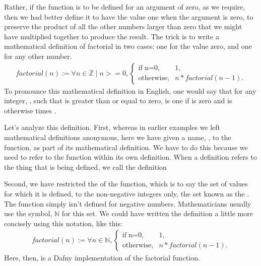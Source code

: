 \documentclass[letterpaper,10pt,english]{sphinxmanual}
\begin{document}
Rather, if the function is to be defined for an argument of zero, as
we require, then we had better define it to have the value one when
the argument is zero, to preserve the product of all the other numbers
larger than zero that we might have multiplied together to produce the
result. The trick is to write a mathematical definition of factorial
in two cases: one for the value zero, and one for any other number.
\begin{equation*}
\begin{split}factorial(n) := \forall n \in {\mathbb Z} \mid n >= 0, \begin{cases}
\text{if n=0}, & 1,\\ \text{otherwise}, & n *
factorial(n-1).\end{cases}\end{split}
\end{equation*}
To pronounce this mathematical definition in English, one would say
that for any integer, , such that  is greater than or equal to
zero,  is one if  is zero and is otherwise  times
.

Let’s analyze this definition. First, whereas in earlier examples we
left mathematical definitions anonymous, here we have given a name,
, to the function, as part of its mathematical definition.
We have to do this because we need to refer to the function within its
own definition.  When a definition refers to the thing that is being
defined, we call the definition 

Second, we have restricted the  of the function, which is to
say the set of values for which it is defined, to the non-negative
integers only, the set known as the . The function
simply isn’t defined for negative numbers.  Mathematicians usually use
the symbol, \({\mathbb N}\) for this set. We could have written
the definition a little more concisely using this notation, like this:
\begin{equation*}
\begin{split}factorial(n) := \forall n \in {\mathbb N}, \begin{cases}
\text{if n=0}, & 1,\\ \text{otherwise}, & n *
factorial(n-1).\end{cases}\end{split}
\end{equation*}
Here, then, is a Dafny implementation of the factorial function.
\end{document}

